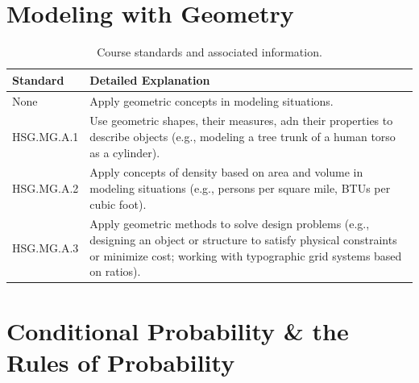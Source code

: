 \documentclass[12pt, oneside]{book}
\begin{document}
\chapter{Modeling with Geometry}

\begin{table}[h]
    \centering
    \caption{Course standards and associated information.}
    \vspace{0.3cm} %
    \begin{tabularx}{\textwidth}{l X} %
        \toprule
        \textbf{Standard} & \textbf{Detailed Explanation} \\
        \midrule
        None & Apply geometric concepts in modeling situations. \\
        HSG.MG.A.1 & Use geometric shapes, their measures, adn their properties to describe objects (e.g., modeling a tree trunk of a human torso as a cylinder). \\
        HSG.MG.A.2 & Apply concepts of density based on area and volume in modeling situations (e.g., persons per square mile, BTUs per cubic foot). \\
        HSG.MG.A.3 & Apply geometric methods to solve design problems (e.g., designing an object or structure to satisfy physical constraints or minimize cost; working with typographic grid systems based on ratios). \\
        \bottomrule
    \end{tabularx}
\end{table}

\chapter{Conditional Probability \& the Rules of Probability}
\end{document}
